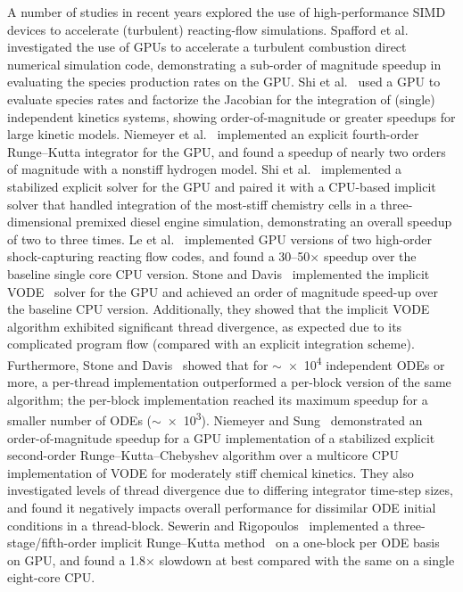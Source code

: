 \documentclass[preprint]{elsarticle}
\begin{document}
A number of studies in recent years explored the use of high-performance SIMD devices to accelerate (turbulent) reacting-flow simulations.
Spafford et al.~\cite{Spafford:2010aa} investigated the use of GPUs to accelerate a turbulent combustion direct numerical simulation code, demonstrating a sub-order of magnitude speedup in evaluating the species production rates on the GPU.
Shi et al.~\cite{Shi:2011aa} used a GPU to evaluate species rates and factorize the Jacobian for the integration of (single) independent kinetics systems, showing order-of-magnitude or greater speedups for large kinetic models.
Niemeyer et al.~\cite{Niemeyer:2011aa} implemented an explicit fourth-order Runge--Kutta integrator for the GPU, and found a speedup of nearly two orders of magnitude with a nonstiff hydrogen model.
Shi et al.~\cite{Shi:2012aa} implemented a stabilized explicit solver for the GPU and paired it with a CPU-based implicit solver that handled integration of the most-stiff chemistry cells in a three-dimensional premixed diesel engine simulation, demonstrating an overall speedup of two to three times.
Le et al.~\cite{Le2013596} implemented GPU versions of two high-order shock-capturing reacting flow codes, and found a \numrange{30}{50}$\times$ speedup over the baseline single core CPU version.
Stone and Davis~\cite{Stone:2013aa} implemented the implicit VODE~\cite{Brown:1989vl} solver for the GPU and achieved an order of magnitude speed-up over the baseline CPU version.
Additionally, they showed that the implicit VODE algorithm exhibited significant thread divergence, as expected due to its complicated program flow (compared with an explicit integration scheme).
Furthermore, Stone and Davis~\cite{Stone:2013aa} showed that for $\sim$\num{e4} independent ODEs or more, a per-thread implementation outperformed a per-block version of the same algorithm; the per-block implementation reached its maximum speedup for a smaller number of ODEs ($\sim$\num{e3}).
Niemeyer and Sung~\cite{Niemeyer:2014aa} demonstrated an order-of-magnitude speedup for a GPU implementation of a stabilized explicit second-order Runge--Kutta--Chebyshev algorithm over a multicore CPU implementation of VODE for moderately stiff chemical kinetics.
They also investigated levels of thread divergence due to differing integrator time-step sizes, and found it negatively impacts overall performance for dissimilar ODE initial conditions in a thread-block.
Sewerin and Rigopoulos~\cite{Sewerin20151375} implemented a three-stage\slash fifth-order implicit Runge--Kutta method~\cite{wanner1991solving} on a one-block per ODE basis on GPU, and found a \num{1.8}$\times$ slowdown at best compared with the same on a single eight-core CPU.
\end{document}

